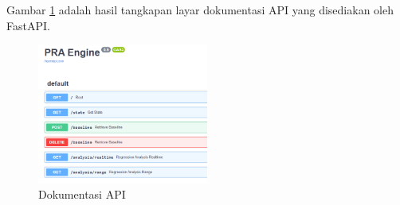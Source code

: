 Gambar \ref{api_docs} adalah hasil tangkapan layar dokumentasi API yang disediakan oleh FastAPI. 
\begin{figure}[!htb]
	\centering
	\includegraphics[width=0.5\textwidth]{resources/ch4/api_docs.png}
	\caption{Dokumentasi API}
	\label{api_docs}
\end{figure} 

